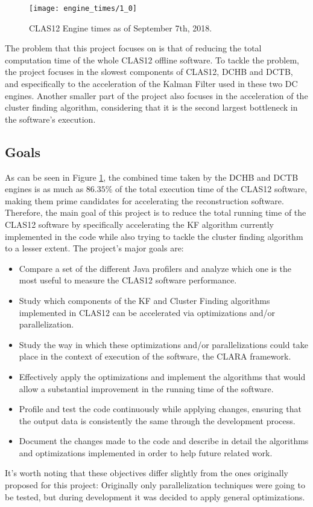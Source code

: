     \begin{figure}[ht] %
        \centering
        \texttt{[image: engine\_times/1\_0]}
        \caption{\label{fig:engines-times-sep2018} CLAS12 Engine times as of September 7th, 2018.}
    \end{figure}

The problem that this project focuses on is that of reducing the total computation time of the whole CLAS12 offline software.
To tackle the problem, the project focuses in the slowest components of CLAS12, DCHB and DCTB, and especifically to the acceleration of the Kalman Filter used in these two DC engines.
Another smaller part of the project also focuses in the acceleration of the cluster finding algorithm, considering that it is the second largest bottleneck in the software's execution.


\subsection{Goals} \label{ssec:prob_goals}
As can be seen in Figure \ref{fig:engines-times-sep2018}, the combined time taken by the DCHB and DCTB engines is as much as $86.35$\% of the total execution time of the CLAS12 software, making them prime candidates for accelerating the reconstruction software.
Therefore, the main goal of this project is to reduce the total running time of the CLAS12 software by specifically accelerating the KF algorithm currently implemented in the code while also trying to tackle the cluster finding algorithm to a lesser extent.
The project's major goals are:

\newpage

    \begin{itemize}
        \item Compare a set of the different Java profilers and analyze which one is the most useful to measure the CLAS12 software performance.
        \item Study which components of the KF and Cluster Finding algorithms implemented in CLAS12 can be accelerated via optimizations and/or parallelization.
        \item Study the way in which these optimizations and/or parallelizations could take place in the context of execution of the software, the CLARA framework.
        \item Effectively apply the optimizations and implement the algorithms that would allow a substantial improvement in the running time of the software.
        \item Profile and test the code continuously while applying changes, ensuring that the output data is consistently the same through the development process.
        \item Document the changes made to the code and describe in detail the algorithms and optimizations implemented in order to help future related work.
    \end{itemize}

It's worth noting that these objectives differ slightly from the ones originally proposed for this project: Originally only parallelization techniques were going to be tested, but during development it was decided to apply general optimizations.